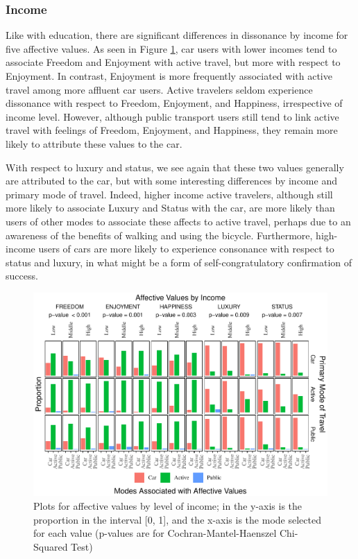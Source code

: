 \documentclass[]{elsarticle} %
\makeatletter
\def\maxwidth{\ifdim\Gin@nat@width>\linewidth\linewidth
\else\Gin@nat@width\fi}
\let\Oldincludegraphics\includegraphics
\renewcommand{\includegraphics}[1]{\Oldincludegraphics[width=\maxwidth]{#1}}
\makeatother
\begin{document}
\hypertarget{income-1}{%
\subsubsection{Income}\label{income-1}}

Like with education, there are significant differences in dissonance by
income for five affective values. As seen in Figure
\ref{fig:bar-plots-by-income}, car users with lower incomes tend to
associate Freedom and Enjoyment with active travel, but more with
respect to Enjoyment. In contrast, Enjoyment is more frequently
associated with active travel among more affluent car users. Active
travelers seldom experience dissonance with respect to Freedom,
Enjoyment, and Happiness, irrespective of income level. However,
although public transport users still tend to link active travel with
feelings of Freedom, Enjoyment, and Happiness, they remain more likely
to attribute these values to the car.

With respect to luxury and status, we see again that these two values
generally are attributed to the car, but with some interesting
differences by income and primary mode of travel. Indeed, higher income
active travelers, although still more likely to associate Luxury and
Status with the car, are more likely than users of other modes to
associate these affects to active travel, perhaps due to an awareness of
the benefits of walking and using the bicycle. Furthermore, high-income
users of cars are more likely to experience consonance with respect to
status and luxury, in what might be a form of self-congratulatory
confirmation of success.

\begin{figure}
\centering
\includegraphics{Dissonance_Santiago_v2_files/figure-latex/figure-bar-plots-by-attribute-and-income-1.pdf}
\caption{\label{fig:bar-plots-by-income}Plots for affective values by
level of income; in the y-axis is the proportion in the interval {[}0,
1{]}, and the x-axis is the mode selected for each value (p-values are
for Cochran-Mantel-Haenszel Chi-Squared Test)}
\end{figure}
\end{document}
